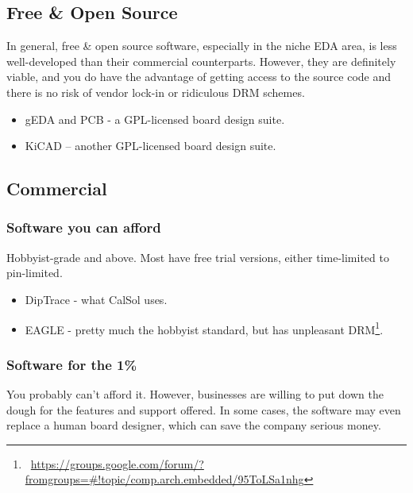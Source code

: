 \documentclass[letterpaper]{article}
\newcommand\liststyleRTFNumxii{%
\renewcommand\labelitemi{{\textbullet}}
\renewcommand\labelitemii{o}
\renewcommand\labelitemiii{${\blacksquare}$}
\renewcommand\labelitemiv{{\textbullet}}
}
\begin{document}
\subsection{Free \& Open Source}
\hypertarget{Toc337742708}{}{\sffamily\color[rgb]{0.30980393,0.5058824,0.7411765}
In general, free \& open source software, especially in the niche EDA area, is less well-developed than their commercial
counterparts. However, they are definitely viable, and you do have the advantage of getting access to the source code
and there is no risk of vendor lock-in or ridiculous DRM schemes.}

\liststyleRTFNumxii
\begin{itemize}
\item {\sffamily\color[rgb]{0.30980393,0.5058824,0.7411765}
gEDA and PCB - a GPL-licensed board design suite.}
\item {\sffamily\color[rgb]{0.30980393,0.5058824,0.7411765}
KiCAD -- another GPL-licensed board design suite.}
\end{itemize}
\subsection{Commercial}
\hypertarget{Toc337742709}{}\subsubsection{Software you can afford}
\hypertarget{Toc337742710}{}{\sffamily\color[rgb]{0.30980393,0.5058824,0.7411765}
Hobbyist-grade and above. Most have free trial versions, either time-limited to pin-limited.}

\liststyleRTFNumxii
\begin{itemize}
\item {\sffamily\color[rgb]{0.30980393,0.5058824,0.7411765}
DipTrace - what CalSol uses.}
\item {\sffamily\color[rgb]{0.30980393,0.5058824,0.7411765}
EAGLE - pretty much the hobbyist standard, but has unpleasant
DRM\footnote{\ \url{https://groups.google.com/forum/?fromgroups=\#!topic/comp.arch.embedded/95ToLSa1nhg} }.}
\end{itemize}
\subsubsection{Software for the 1\%}
\hypertarget{Toc337742711}{}{\sffamily\color[rgb]{0.30980393,0.5058824,0.7411765}
You probably can't afford it. However, businesses are willing to put down the dough for the features and support
offered. In some cases, the software may even replace a human board designer, which can save the company serious
money.}
\end{document}
